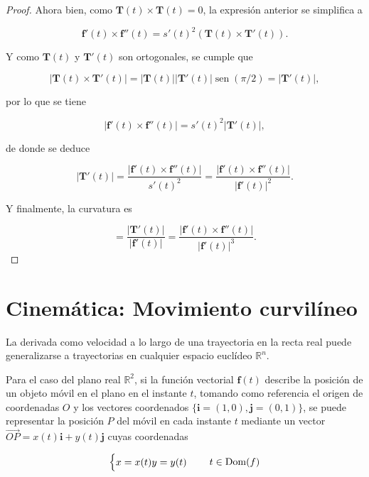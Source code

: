 \documentclass[
  a4paper,
]{scrreport}
\theoremstyle{plain}
\theoremstyle{plain}
\theoremstyle{definition}
\theoremstyle{definition}
\theoremstyle{plain}
\theoremstyle{remark}
\begin{document}
\begin{tcolorbox}
\begin{proof}
Ahora bien, como \(\mathbf{T}(t)\times \mathbf{T}(t)=0\), la expresión
anterior se simplifica a

\[
\mathbf{f}'(t)\times \mathbf{f}''(t) 
= s'(t)^2 (\mathbf{T}(t)\times \mathbf{T}'(t)).
\]

Y como \(\mathbf{T}(t)\) y \(\mathbf{T}'(t)\) son ortogonales, se cumple
que

\[
|\mathbf{T}(t)\times \mathbf{T}'(t)| = |\mathbf{T}(t)||\mathbf{T}'(t)|\operatorname{sen}(\pi/2) = |\mathbf{T}'(t)|,
\]

por lo que se tiene

\[
|\mathbf{f}'(t)\times \mathbf{f}''(t)| 
= s'(t)^2 |\mathbf{T}'(t)|,
\]

de donde se deduce

\[
|\mathbf{T}'(t)| 
= \frac{|\mathbf{f}'(t)\times \mathbf{f}''(t)|}{s'(t)^2}
= \frac{|\mathbf{f}'(t)\times \mathbf{f}''(t)|}{|\mathbf{f}'(t)|^2}.
\]

Y finalmente, la curvatura es

\[
= \frac{|\mathbf{T}'(t)|}{|\mathbf{f}'(t)|} 
= \frac{|\mathbf{f}'(t)\times \mathbf{f}''(t)|}{|\mathbf{f}'(t)|^3}.
\]

\end{proof}

\end{tcolorbox}

\hypertarget{cinemuxe1tica-movimiento-curviluxedneo}{%
\section{Cinemática: Movimiento
curvilíneo}\label{cinemuxe1tica-movimiento-curviluxedneo}}

La derivada como velocidad a lo largo de una trayectoria en la recta
real puede generalizarse a trayectorias en cualquier espacio euclídeo
\(\mathbb{R}^n\).

Para el caso del plano real \(\mathbb{R}^2\), si la función vectorial
\(\mathbf{f}(t)\) describe la posición de un objeto móvil en el plano en
el instante \(t\), tomando como referencia el origen de coordenadas
\(O\) y los vectores coordenados
\(\{\mathbf{i}=(1,0),\mathbf{j}=(0,1)\}\), se puede representar la
posición \(P\) del móvil en cada instante \(t\) mediante un vector
\(\vec{OP}=x(t)\mathbf{i}+y(t)\mathbf{j}\) cuyas coordenadas

\[
\begin{cases}
x=x(t)\newline
y=y(t)
\end{cases}
\quad
t\in \mbox{Dom}(f)
\]
\end{document}
